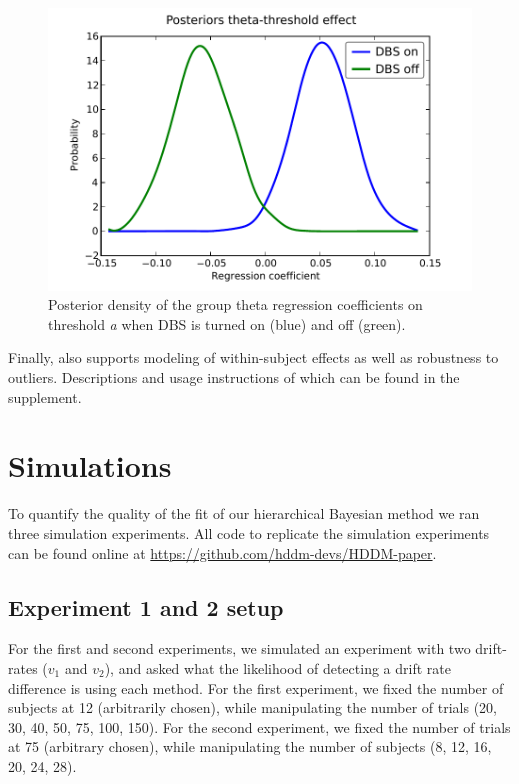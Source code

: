 \documentclass[letterpaper,10pt,english]{article}
\begin{document}
\begin{figure}
\includegraphics[scale=0.6]{fig5.pdf}
\caption{Posterior density of the group theta regression coefficients
on threshold \emph{a} when DBS is turned on (blue) and off (green).}
\label{fig.post_theta}
\end{figure}

Finally,  also supports modeling of within-subject effects
as well as robustness to outliers. Descriptions and usage instructions
of which can be found in the supplement.

\section*{Simulations}

To quantify the quality of the fit of our hierarchical Bayesian method
we ran three simulation experiments. All code to replicate the simulation experiments can be found online at \href{https://github.com/hddm-devs/HDDM-paper}{https://github.com/hddm-devs/HDDM-paper}.

\subsection*{Experiment 1 and 2 setup}
For the first and second experiments, we simulated an experiment with
two drift-rates ($v_{\text{1}}$ and $v_{\text{2}}$), and asked what
the likelihood of detecting a drift rate difference is using each
method. For the first experiment, we fixed the number of subjects at
12 (arbitrarily chosen), while manipulating the number of trials (20,
30, 40, 50, 75, 100, 150).  For the second experiment, we fixed the
number of trials at 75  (arbitrary chosen), while manipulating the
number of subjects (8, 12, 16, 20, 24, 28).
\end{document}
